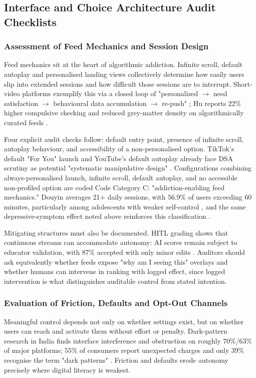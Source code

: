 \documentclass[11pt]{article}
\begin{document}
\subsection{Interface and Choice Architecture Audit Checklists}

\subsubsection{Assessment of Feed Mechanics and Session Design}
\label{sec:assessment_feed_mechanics_session_design} Feed mechanics sit at the heart of algorithmic addiction. Infinite scroll, default autoplay and personalised landing views collectively determine how easily users slip into extended sessions and how difficult those sessions are to interrupt. Short-video platforms exemplify this via a closed loop of "personalized $\rightarrow$ need satisfaction $\rightarrow$ behavioural data accumulation $\rightarrow$ re-push" \parencites[2]{8958037}[3]{8958037}; Hu reports $22\%$ higher compulsive checking and reduced grey-matter density on algorithmically curated feeds \parencites[2]{3303310}[20]{3303310}.

Four explicit audit checks follow: default entry point, presence of infinite scroll, autoplay behaviour, and accessibility of a non-personalised option. TikTok's default "For You" launch and YouTube's default autoplay already face DSA scrutiny as potential "systematic manipulative design" \parencites[42]{3195574}[2]{8958037}. Configurations combining always-personalised launch, infinite scroll, default autoplay, and no accessible non-profiled option are coded Code Category C: "addiction-enabling feed mechanics." Douyin averages 21+ daily sessions, with $56.9\%$ of users exceeding 60 minutes, particularly among adolescents with weaker self-control \parencites[3]{8958037}, and the same depressive-symptom effect noted above reinforces this classification \parencites[20]{3303310}.

Mitigating structures must also be documented. HITL grading shows that continuous streams can accommodate autonomy: AI scores remain subject to educator validation, with $87\%$ accepted with only minor edits \parencites{6805789}[19]{6805789}. Auditors should ask equivalently whether feeds expose "why am I seeing this" overlays and whether humans can intervene in ranking with logged effect, since logged intervention is what distinguishes auditable control from stated intention.

\subsubsection{Evaluation of Friction, Defaults and Opt-Out Channels}
\label{sec:evaluation_friction_defaults_optout} Meaningful control depends not only on whether settings exist, but on whether users can reach and activate them without effort or penalty. Dark-pattern research in India finds interface interference and obstruction on roughly $70\%$/$63\%$ of major platforms; $55\%$ of consumers report unexpected charges and only $39\%$ recognise the term "dark patterns" \parencites[2]{6295677}[10]{9360054}. Friction and defaults erode autonomy precisely where digital literacy is weakest.
\end{document}
